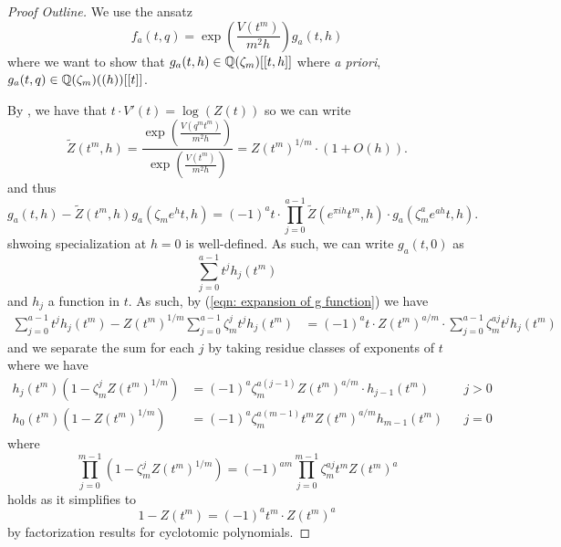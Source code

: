 \begin{proof}[Proof Outline]
    We use the ansatz 
    \begin{equation}\label{eqn: Nahm sum at roots of unity ansatz}
        f_{a}(t,q) = \exp\left(\frac{V(t^{m})}{m^{2}h}\right)g_{a}(t,h)
    \end{equation}
    where we want to show that $g_{a}(t,h)\in\mathbb{Q}(\zeta_{m})[[t,h]]$ where \emph{a priori}, $g_{a}(t,q)\in\mathbb{Q}(\zeta_{m})((h))[[t]]$. 

    By , we have that $t\cdot V'(t)=\log(Z(t))$ so we can write
    $$\widetilde{Z}(t^{m},h)=\frac{\exp\left(\frac{V(q^{m}t^{m})}{m^{2}h}\right)}{\exp\left(\frac{V(t^{m})}{m^{2}h}\right)}=Z(t^{m})^{1/m}\cdot(1+O(h)).$$
    and thus 
    \begin{equation}\label{eqn: expansion of g function}
        g_{a}(t,h)-\widetilde{Z}(t^{m},h)g_{a}(\zeta_{m}e^{h}t,h)=(-1)^{a}t\cdot\prod_{j=0}^{a-1}\widetilde{Z}(e^{\pi i h}t^{m},h)\cdot g_{a}(\zeta_{m}^{a}e^{ah}t,h).
    \end{equation}
    shwoing specialization at $h=0$ is well-defined. As such, we can write $g_{a}(t,0)$ as 
    $$\sum_{j=0}^{a-1}t^{j}h_{j}(t^{m})$$
    and $h_{j}$ a function in $t$. As such, by (\ref{eqn: expansion of g function}) we have
    \begin{align*}
        \sum_{j=0}^{a-1}t^{j}h_{j}(t^{m}) - Z(t^{m})^{1/m}\sum_{j=0}^{a-1}\zeta_{m}^{j}t^{j}h_{j}(t^{m}) &= (-1)^{a}t\cdot Z(t^{m})^{a/m}\cdot\sum_{j=0}^{a-1}\zeta_{m}^{aj}t^{j}h_{j}(t^{m})
    \end{align*}
    and we separate the sum for each $j$ by taking residue classes of exponents of $t$ where we have 
    \begin{align*}
        h_{j}(t^{m})(1-\zeta_{m}^{j}Z(t^{m})^{1/m})&=(-1)^{a}\zeta_{m}^{a(j-1)}Z(t^{m})^{a/m}\cdot h_{j-1}(t^{m}) && j>0 \\
        h_{0}(t^{m})(1-Z(t^{m})^{1/m})&=(-1)^{a}\zeta_{m}^{a(m-1)}t^{m}Z(t^{m})^{a/m}h_{m-1}(t^{m}) && j=0
    \end{align*}
    where 
    $$\prod_{j=0}^{m-1}(1-\zeta_{m}^{j}Z(t^{m})^{1/m})=(-1)^{am}\prod_{j=0}^{m-1}\zeta_{m}^{aj}t^{m}Z(t^{m})^{a}$$
    holds as it simplifies to 
    $$1-Z(t^{m})=(-1)^{a}t^{m}\cdot Z(t^{m})^{a}$$
    by factorization results for cyclotomic polynomials. 
\end{proof}